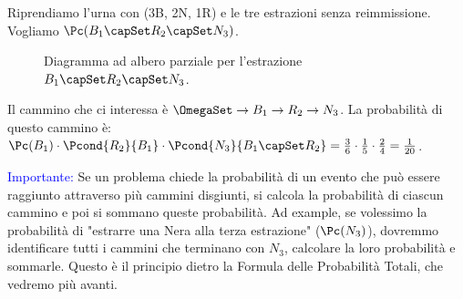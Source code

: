\begin{example}
Riprendiamo l'urna con (3B, 2N, 1R) e le tre estrazioni senza reimmissione. Vogliamo $\Pc(B_1 \capSet R_2 \capSet N_3)$.

\begin{figure}[h!]
\centering
{}
\caption{Diagramma ad albero parziale per l'estrazione $B_1 \capSet R_2 \capSet N_3$.}
\label{fig:tree_brn}
\end{figure}
Il cammino che ci interessa è $\OmegaSet \rightarrow B_1 \rightarrow R_2 \rightarrow N_3$.
La probabilità di questo cammino è:
$\Pc(B_1) \cdot \Pcond{R_2}{B_1} \cdot \Pcond{N_3}{B_1 \capSet R_2} = \frac{3}{6} \cdot \frac{1}{5} \cdot \frac{2}{4} = \frac{1}{20}$.

\textcolor{blue}{Importante:} Se un problema chiede la probabilità di un evento che può essere raggiunto attraverso più cammini disgiunti, si calcola la probabilità di ciascun cammino e poi si sommano queste probabilità. Ad example, se volessimo la probabilità di "estrarre una Nera alla terza estrazione" ($\Pc(N_3)$), dovremmo identificare tutti i cammini che terminano con $N_3$, calcolare la loro probabilità e sommarle. Questo è il principio dietro la Formula delle Probabilità Totali, che vedremo più avanti.
\end{example}

